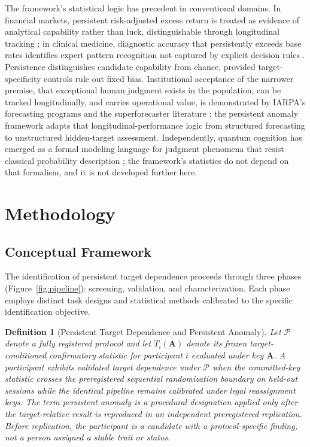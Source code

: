 \documentclass[11pt,letterpaper]{article}
\newtheorem{definition}{Definition}
\begin{document}
The framework's statistical logic has precedent in conventional domains. In financial markets, persistent risk-adjusted excess return is treated as evidence of analytical capability rather than luck, distinguishable through longitudinal tracking \cite{fama2010}; in clinical medicine, diagnostic accuracy that persistently exceeds base rates identifies expert pattern recognition not captured by explicit decision rules \cite{norman2017}. Persistence distinguishes candidate capability from chance, provided target-specificity controls rule out fixed bias. Institutional acceptance of the narrower premise, that exceptional human judgment exists in the population, can be tracked longitudinally, and carries operational value, is demonstrated by IARPA's forecasting programs and the superforecaster literature \cite{tetlock2015}; the persistent anomaly framework adapts that longitudinal-performance logic from structured forecasting to unstructured hidden-target assessment. Independently, quantum cognition has emerged as a formal modeling language for judgment phenomena that resist classical probability description \cite{busemeyer2012,pothos2013}; the framework's statistics do not depend on that formalism, and it is not developed further here.

\section{Methodology}

\subsection{Conceptual Framework}

The identification of persistent target dependence proceeds through three phases (Figure~\ref{fig:pipeline}): screening, validation, and characterization. Each phase employs distinct task designs and statistical methods calibrated to the specific identification objective.

\begin{definition}[Persistent Target Dependence and Persistent Anomaly]
Let $\mathcal{P}$ denote a fully registered protocol and let $T_i(\mathbf{A})$ denote its frozen target-conditioned confirmatory statistic for participant $i$ evaluated under key $\mathbf{A}$. A participant exhibits \textit{validated target dependence under $\mathcal{P}$} when the committed-key statistic crosses the preregistered sequential randomization boundary on held-out sessions while the identical pipeline remains calibrated under legal reassignment keys. The term \textit{persistent anomaly} is a procedural designation applied only after the target-relative result is reproduced in an independent preregistered replication. Before replication, the participant is a candidate with a protocol-specific finding, not a person assigned a stable trait or status.
\end{definition}
\end{document}
